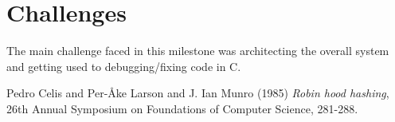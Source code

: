 \documentclass{article}
\begin{document}
\section{Challenges}
The main challenge faced in this milestone was architecting the overall system and getting used to debugging/fixing code in C.

\begin{thebibliography}{9}
    Pedro Celis and Per-{\AA}ke Larson and J. Ian Munro (1985) \emph{Robin hood hashing}, 26th Annual Symposium on Foundations of Computer Science, 281-288. 
\end{thebibliography}
\end{document}
